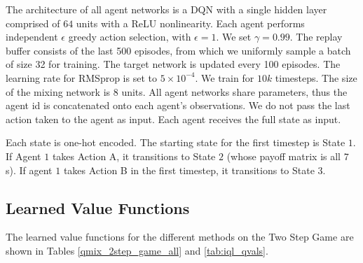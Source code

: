 \documentclass{article}
\begin{document}
The architecture of all agent networks is a DQN with a single hidden layer comprised of $64$ units with a ReLU nonlinearity. Each agent performs independent $\epsilon$ greedy action selection, with $\epsilon=1$. We set $\gamma=0.99$. The replay buffer consists of the last 500 episodes, from which we uniformly sample a batch of size 32 for training. The target network is updated every 100 episodes. The learning rate for RMSprop is set to $5 \times 10^{-4}$. We train for $10k$ timesteps. The size of the mixing network is $8$ units. All agent networks share parameters, thus the agent id is concatenated onto each agent's observations. We do not pass the last action taken to the agent as input. Each agent receives the full state as input.

Each state is one-hot encoded. The starting state for the first timestep is State $1$. If Agent $1$ takes Action A, it transitions to State $2$ (whose payoff matrix is all $7$s). If agent $1$ takes Action B in the first timestep, it transitions to State $3$. 

\subsection{Learned Value Functions}

The learned value functions for the different methods on the Two Step Game are shown in Tables \ref{qmix_2step_game_all} and \ref{tab:iql_qvals}. 
\end{document}
